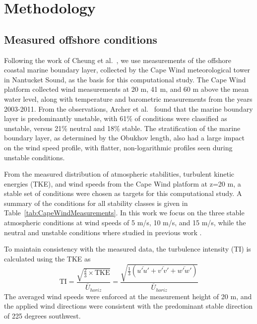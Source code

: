 \section{Methodology}

\subsection{Measured offshore conditions}

Following the work of Cheung et al.~\cite{cheung2020large}, we use
measurements of the offshore coastal marine boundary layer, collected
by the Cape Wind meteorological tower in Nantucket Sound, as the basis
for this computational study.  The Cape Wind platform collected wind
measurements at 20 m, 41 m, and 60 m above the mean water level, along
with temperature and barometric measurements from the years 2003-2011.
From the observations, Archer et al.~\cite{archer2016predominance}
found that the marine boundary layer is predominantly unstable, with
61\% of conditions were classified as unstable, versus 21\% neutral and
18\% stable.  The stratification of the marine boundary layer, as
determined by the Obukhov length, also had a large impact on the wind
speed profile, with flatter, non-logarithmic profiles seen during
unstable conditions.

From the measured distribution of atmospheric stabilities, turbulent
kinetic energies (TKE), and wind speeds from the Cape Wind platform at
z=20 m, a stable set of conditions were chosen as targets for this
computational study.  A summary of the conditions for all stability
classes is given in Table~\ref{tab:CapeWindMeasurements}. In this work we
focus on the three stable atmospheric conditions at wind speeds of
5 m/s, 10 m/s, and 15 m/s, while the neutral and unstable conditions
where studied in previous work \cite{cheung2020large}.

To maintain consistency with the measured data, the turbulence
intensity (TI) is calculated using the TKE as
\begin{equation}
  \textrm{TI} =
  \frac{\sqrt{\frac{2}{3}\times\textrm{TKE}}}{\overline{U}_{horiz}} =
  \frac{\sqrt{\frac{1}{3}\left( \overline{u'u'} + \overline{v'v'} + \overline{w'w'}
      \right)}}{\overline{U}_{horiz}}
\end{equation}
The averaged wind speeds were enforced at the measurement height of
20 m, and the applied wind directions were consistent with the
predominant stable direction of 225 degrees southwest.

